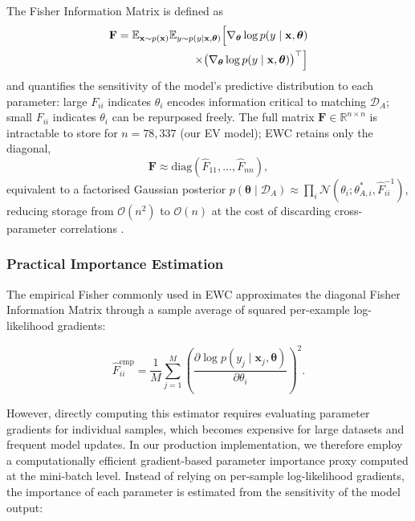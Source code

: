 \documentclass[journal]{IEEEtran}
\newcommand{\fisher}{\mathbf{F}}
\newcommand{\params}{\bm{\theta}}
\newcommand{\real}{\mathbb{R}}
\begin{document}
The Fisher Information Matrix is defined as
\begin{equation}
\begin{split}
    \fisher = \mathbb{E}_{\mathbf{x} \sim p(\mathbf{x})}
    \mathbb{E}_{y \sim p(y \mid \mathbf{x}, \params)}
    \Bigl[ \nabla_{\params} \log p(y \mid \mathbf{x}, \params) \\
    \times \bigl(\nabla_{\params} \log p(y \mid \mathbf{x}, \params)\bigr)^\top \Bigr]
\end{split}
\label{eq:fisher_full}
\end{equation}
and quantifies the sensitivity of the model's predictive distribution
to each parameter: large $F_{ii}$ indicates $\theta_i$ encodes
information critical to matching $\mathcal{D}_A$; small $F_{ii}$
indicates $\theta_i$ can be repurposed freely. The full matrix
$\fisher \in \real^{n\times n}$ is intractable to store for
$n = 78{,}337$ (our EV model); EWC retains only the diagonal,
\begin{equation}
    \fisher \approx \mathrm{diag}(\hat{F}_{11}, \ldots, \hat{F}_{nn}),
    \label{eq:diag_approx}
\end{equation}
equivalent to a factorised Gaussian posterior
$p(\params \mid \mathcal{D}_A) \approx \prod_i \mathcal{N}(\theta_i;
\theta_{A,i}^*, \hat{F}_{ii}^{-1})$, reducing storage from
$\mathcal{O}(n^2)$ to $\mathcal{O}(n)$ at the cost of discarding
cross-parameter correlations .

\subsubsection{Practical Importance Estimation}
\label{sec:practical_fisher}
The empirical Fisher commonly used in EWC approximates the diagonal
Fisher Information Matrix through a sample average of squared
per-example log-likelihood gradients:

\begin{equation}
    \hat{F}_{ii}^{\mathrm{emp}}
    =
    \frac{1}{M}
    \sum_{j=1}^{M}
    \left(
    \frac{\partial
    \log p(y_j \mid \mathbf{x}_j,\boldsymbol{\theta})}
    {\partial \theta_i}
    \right)^2 .
    \label{eq:empirical_fisher}
\end{equation}

However, directly computing this estimator requires evaluating
parameter gradients for individual samples, which becomes expensive for
large datasets and frequent model updates. In our production
implementation, we therefore employ a computationally efficient
gradient-based parameter importance proxy computed at the mini-batch
level. Instead of relying on per-sample log-likelihood gradients, the
importance of each parameter is estimated from the sensitivity of the
model output:
\end{document}
